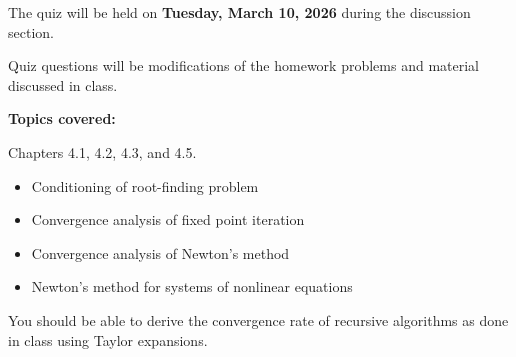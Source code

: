 \documentclass[reqno, answers]{exam}
\begin{document}
The quiz will be held on {\bf Tuesday, March 10, 2026} during the discussion section.

Quiz questions will be modifications of the homework problems and material discussed in class.

\textbf{Topics covered:} 

Chapters 4.1, 4.2, 4.3, and 4.5.

\begin{itemize}
    \item Conditioning of root-finding problem
    \item Convergence analysis of fixed point iteration
    \item Convergence analysis of Newton's method
    \item Newton's method for systems of nonlinear equations
\end{itemize}

You should be able to derive the convergence rate of recursive algorithms as done in class using Taylor expansions.
\end{document}
